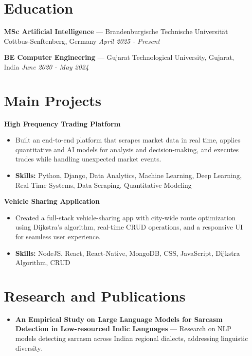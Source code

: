 \documentclass[a4paper,10pt]{article}
\begin{document}
\section*{Education}
\textbf{MSc Artificial Intelligence} — Brandenburgische Technische Universität Cottbus-Senftenberg, Germany \hfill \textit{April 2025 - Present}\par
\vspace{1.5pt}
\textbf{BE Computer Engineering} — Gujarat Technological University, Gujarat, India \hfill \textit{June 2020 - May 2024}\par

\section*{Main Projects}
\textbf{High Frequency Trading Platform}\par
\vspace{1pt}
\begin{itemize}
  \item Built an end-to-end platform that scrapes market data in real time, applies quantitative and AI models for analysis and decision-making, and executes trades while handling unexpected market events.
  \item \textbf{Skills:} Python, Django, Data Analytics, Machine Learning, Deep Learning, Real-Time Systems, Data Scraping, Quantitative Modeling
\end{itemize}
\vspace{3pt}
\textbf{Vehicle Sharing Application}\par
\vspace{1pt}
\begin{itemize}
  \item Created a full-stack vehicle-sharing app with city-wide route optimization using Dijkstra's algorithm, real-time CRUD operations, and a responsive UI for seamless user experience.
  \item \textbf{Skills:} NodeJS, React, React-Native, MongoDB, CSS, JavaScript, Dijkstra Algorithm, CRUD
\end{itemize}

\section*{Research and Publications}
\begin{itemize}
\item \textbf{An Empirical Study on Large Language Models for Sarcasm Detection in Low-resourced Indic Languages} — Research on NLP models detecting sarcasm across Indian regional dialects, addressing linguistic diversity.
\end{itemize}
\end{document}
